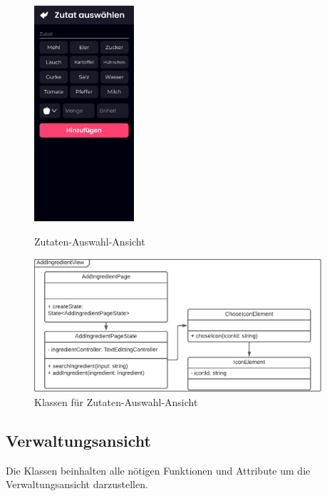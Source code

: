 \documentclass[parskip=full]{scrartcl}
\begin{document}
        \begin{figure}[htp]
            \begin{minipage}
                [t]{0.49\textwidth}
                \centering
                \includegraphics[height=80mm]{images/Presentation-layer/IngredientPickerView.jpg}
                \caption{Zutaten-Auswahl-Ansicht}
            \end{minipage}
            \begin{minipage}
                [t]{0.49\textwidth}
                \centering
                \includegraphics[width=0.95\textwidth]{images/Presentation-layer/IngredientPickerViewClass.pdf}
                \caption{Klassen für Zutaten-Auswahl-Ansicht}
            \end{minipage}
        \end{figure}    
            
        \newpage

\subsection{Verwaltungsansicht}
    Die Klassen beinhalten alle nötigen Funktionen und Attribute um die Verwaltungsansicht darzustellen.
\end{document}
